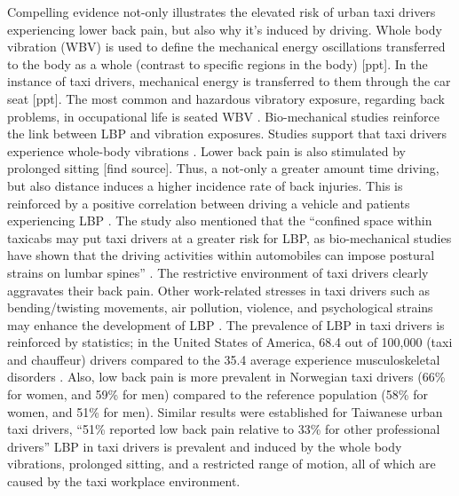 \documentclass[11pt]{article}
\begin{document}
Compelling evidence not-only illustrates the elevated risk of urban
taxi drivers experiencing lower back pain, but also why it’s induced
by driving. Whole body vibration (WBV) is used to define the
mechanical energy oscillations transferred to the body as a whole
(contrast to specific regions in the body) [ppt]. In the instance of
taxi drivers, mechanical energy is transferred to them through the car
seat [ppt]. The most common and hazardous vibratory exposure,
regarding back problems, in occupational life is seated WBV
\cite{ODrivers@Risk}. Bio-mechanical studies reinforce the link
between LBP and vibration exposures. Studies support that taxi drivers
experience whole-body vibrations \cite{KneePain, Serious}. Lower back
pain is also stimulated by prolonged sitting [find source]. Thus, a
not-only a greater amount time driving, but also distance induces a
higher incidence rate of back injuries\cite{Question?}. This is
reinforced by a positive correlation between driving a vehicle and
patients experiencing LBP \cite{ODrivers@Risk}.  The study also
mentioned that the “confined space within taxicabs may put taxi
drivers at a greater risk for LBP, as bio-mechanical studies have
shown that the driving activities within automobiles can impose
postural strains on lumbar spines” \cite{KneePain}. The restrictive
environment of taxi drivers clearly aggravates their back pain. Other
work-related stresses in taxi drivers such as bending/twisting
movements, air pollution, violence, and psychological strains may
enhance the development of LBP \cite{KneePain, POSTULATED}. The
prevalence of LBP in taxi drivers is reinforced by statistics; in the
United States of America, 68.4 out of 100,000 (taxi and chauffeur)
drivers compared to the 35.4 average experience musculoskeletal
disorders \cite{68}. Also, low back pain is more prevalent in
Norwegian taxi drivers (66\% for women, and 59\% for men) compared to
the reference population (58\% for women, and 51\% for men). Similar
results were established for Taiwanese urban taxi drivers, “51\%
reported low back pain relative to 33\% for other professional
drivers” \cite{Question?} LBP in taxi drivers is prevalent and induced
by the whole body vibrations, prolonged sitting, and a restricted
range of motion, all of which are caused by the taxi workplace
environment.
 
\end{document}
